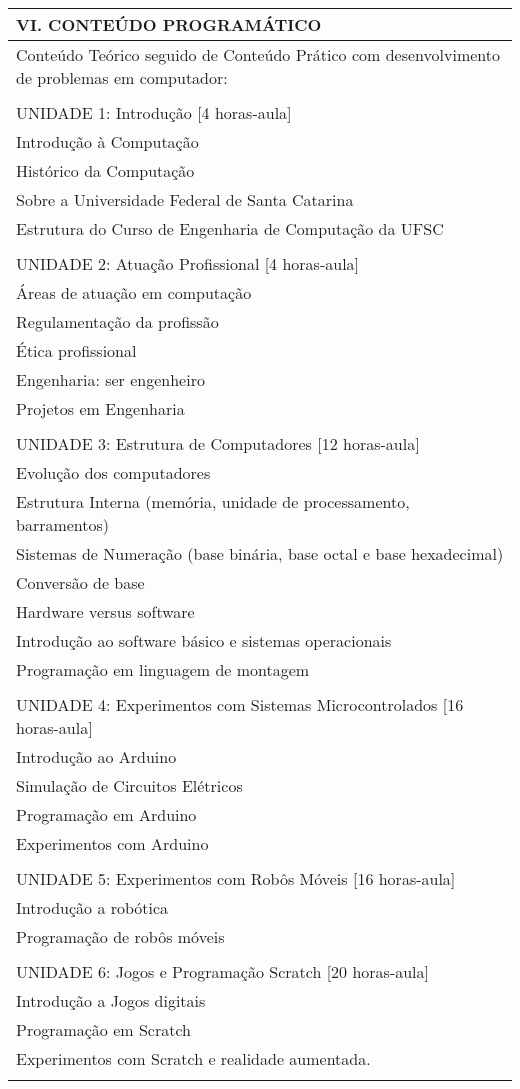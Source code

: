 \documentclass[12pt]{article}
\begin{document}
\begin{longtable}{|L{1.025\textwidth}|} \hline
%
{\bf VI. CONTEÚDO PROGRAMÁTICO } \\ \hline
Conteúdo Teórico seguido de Conteúdo Prático com desenvolvimento de problemas em computador: \\
\\
UNIDADE 1: Introdução [4 horas-aula]\\
Introdução à Computação\\
Histórico da Computação\\
Sobre a Universidade Federal de Santa Catarina\\
Estrutura do Curso de Engenharia de Computação da UFSC\\
\\
UNIDADE 2: Atuação Profissional [4 horas-aula]\\
Áreas de atuação em computação\\
Regulamentação da profissão\\
Ética profissional\\
Engenharia: ser engenheiro\\
Projetos em Engenharia\\
\\
UNIDADE 3: Estrutura de Computadores [12 horas-aula]\\
Evolução dos computadores\\
Estrutura Interna (memória, unidade de processamento, barramentos)\\
Sistemas de Numeração (base binária, base octal e base hexadecimal)\\
Conversão de base\\
Hardware versus software\\
Introdução ao software básico e sistemas operacionais\\
Programação em linguagem de montagem\\
\\
UNIDADE 4: Experimentos com Sistemas Microcontrolados [16 horas-aula]\\
Introdução ao Arduino\\
Simulação de Circuitos Elétricos\\
Programação em Arduino\\
Experimentos com Arduino\\
\\
UNIDADE 5: Experimentos com Robôs Móveis [16 horas-aula]\\
Introdução a robótica\\
Programação de robôs móveis\\
\\
UNIDADE 6: Jogos e Programação Scratch [20 horas-aula]\\
Introdução a Jogos digitais\\
Programação em Scratch\\
Experimentos com Scratch e realidade aumentada.\\
\\ \hline
\end{longtable} 
\end{document}
